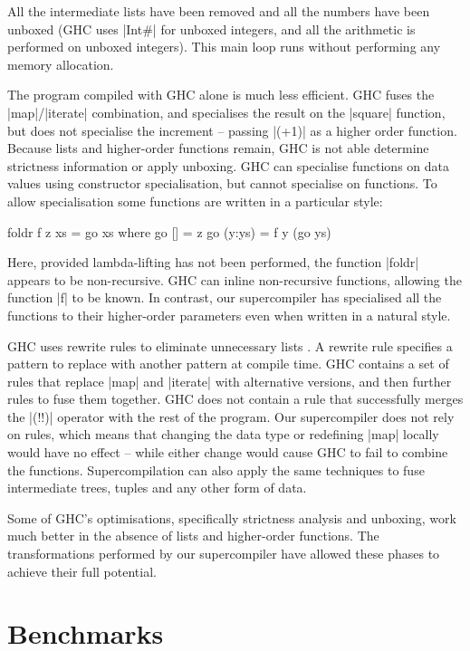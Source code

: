 \documentclass[draft]{sigplanconf}
\begin{document}
All the intermediate lists have been removed and all the numbers have been unboxed (GHC uses |Int#| for unboxed integers, and all the arithmetic is performed on unboxed integers). This main loop runs without performing any memory allocation.

The program compiled with GHC alone is much less efficient. GHC fuses the |map|/|iterate| combination, and specialises the result on the |square| function, but does not specialise the increment -- passing |(+1)| as a higher order function. Because lists and higher-order functions remain, GHC is not able determine strictness information or apply unboxing. GHC can specialise functions on data values using constructor specialisation, but cannot specialise on functions. To allow specialisation some functions are written in a particular style:

\begin{code}
foldr f z xs = go xs
    where  go []      = z
           go (y:ys)  = f y (go ys)
\end{code}

Here, provided lambda-lifting has not been performed, the function |foldr| appears to be non-recursive. GHC can inline non-recursive functions, allowing the function |f| to be known. In contrast, our supercompiler has specialised all the functions to their higher-order parameters even when written in a natural style.

GHC uses rewrite rules to eliminate unnecessary lists \cite{spj:rules}. A rewrite rule specifies a pattern to replace with another pattern at compile time. GHC contains a set of rules that replace |map| and |iterate| with alternative versions, and then further rules to fuse them together. GHC does not contain a rule that successfully merges the |(!!)| operator with the rest of the program. Our supercompiler does not rely on rules, which means that changing the data type or redefining |map| locally would have no effect -- while either change would cause GHC to fail to combine the functions. Supercompilation can also apply the same techniques to fuse intermediate trees, tuples and any other form of data.

Some of GHC's optimisations, specifically strictness analysis and unboxing, work much better in the absence of lists and higher-order functions. The transformations performed by our supercompiler have allowed these phases to achieve their full potential.

\section{Benchmarks}
\label{sec:benchmarks}
\end{document}
